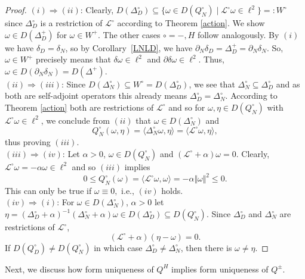 \documentclass[10pt]{amsart}
\theoremstyle{definition}
\renewcommand{\bullet}{{\circ}}
\begin{document}
\begin{proof}
	$(i)\Rightarrow (ii)$: Clearly, $D(\Delta^\bullet_D)\subseteq\lbrace \omega\in D(Q^\bullet_N)\mid\mathcal{L}^\bullet\omega\in\ell^2\rbrace=:W^{\bullet}$ since $\Delta^\bullet_D$ is a restriction of $\mathcal{L}^\bullet$ according to Theorem \ref{action}. 
	We show $\omega\in D(\Delta^{+}_D)$ for $\omega \in W^{+}.$ The other cases $\bullet=-,H$ follow analogously.  By $(i)$ we have $\delta_{D}=\delta_{N}$, so by Corollary~\ref{LNLD}, we have $\partial_N\delta_D = \Delta^+_D= \partial_N\delta_N.$
	So, $\omega \in W^{+}$ precisely means that $\delta\omega\in\ell^2$ and $\partial\delta\omega\in\ell^2.$
	Thus, $\omega\in D(\partial_N\delta_N) = D(\Delta^+).$\\
	$(ii)\Rightarrow (iii)$: Since $D(\Delta^\bullet_N)\subseteq W^{\bullet} = D(\Delta^\bullet_D)$, we see that $\Delta^\bullet_N\subseteq\Delta^\bullet_D$ and as both are self-adjoint operators this already means $\Delta^\bullet_D = \Delta^\bullet_N.$ According to Theorem \ref{action} both are restrictions of $\mathcal{L}^\bullet$ and so for $\omega,\eta\in D(Q^\bullet_N)$ with $\mathcal{L}^\bullet\omega\in\ell^2$, we conclude from $(ii)$ that $\omega\in D(\Delta^\bullet_N)$ and $$Q^\bullet_N(\omega,\eta) = \langle\Delta^\bullet_N\omega,\eta\rangle = \langle\mathcal{L}^\bullet\omega,\eta\rangle,$$ thus proving $(iii)$.\\
    	$(iii)\Rightarrow (iv)$: Let $\alpha>0$, $\omega\in D(Q^\bullet_N)$ and $(\mathcal{L}^\bullet+\alpha)\omega = 0.$ Clearly, $\mathcal{L}^\bullet\omega = -\alpha\omega\in\ell^2$ and so $(iii)$ implies
    $$0\leq Q^\bullet_N(\omega) = \langle\mathcal{L}^\bullet\omega,\omega\rangle = -\alpha\Vert\omega\Vert^2\leq 0.$$ This can only be true if $\omega\equiv 0,$ i.e., $(iv)$ holds.\\
    $(iv)\Rightarrow (i)$: For $\omega\in D(\Delta^\bullet_N)$, $\alpha>0$  let  $\eta = (\Delta^\bullet_{D}+\alpha)^{-1}(\Delta_{N}^\bullet+\alpha)\omega\in D(\Delta^{\bullet}_{D})\subseteq D(Q^{\bullet}_{N}).$ Since $\Delta^{\bullet}_{D}$ and $\Delta^{\bullet}_{N}$  are restrictions of $\mathcal{L}^{\bullet}$,  $$(\mathcal{L}^\bullet+\alpha)(\eta-\omega) = 0.$$
    If $D(Q^\bullet_{D})\neq D(Q^\bullet_N)$ in which case $\Delta^\bullet_{D}\neq\Delta^\bullet_N$, then there is $\omega\neq \eta$.
\end{proof}

Next, we discuss  how form uniqueness of $Q^{H}$ implies form uniqueness of $Q^{\pm}$.
\end{document}
